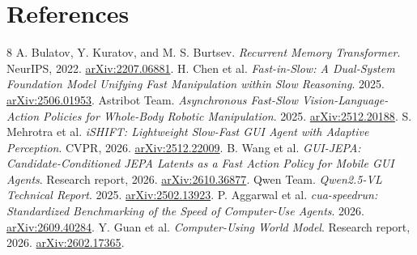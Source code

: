 \documentclass[11pt,letterpaper]{article}
\begin{document}
\section*{References}
\begingroup\small\raggedright
\renewcommand{\section}[2]{}%
\begin{thebibliography}{8}
\setlength{\itemsep}{3pt}
 A. Bulatov, Y. Kuratov, and M. S. Burtsev. \emph{Recurrent Memory Transformer}. NeurIPS, 2022. \href{https://arxiv.org/abs/2207.06881}{arXiv:2207.06881}.
 H. Chen et al. \emph{Fast-in-Slow: A Dual-System Foundation Model Unifying Fast Manipulation within Slow Reasoning}. 2025. \href{https://arxiv.org/abs/2506.01953}{arXiv:2506.01953}.
 Astribot Team. \emph{Asynchronous Fast-Slow Vision-Language-Action Policies for Whole-Body Robotic Manipulation}. 2025. \href{https://arxiv.org/abs/2512.20188}{arXiv:2512.20188}.
 S. Mehrotra et al. \emph{iSHIFT: Lightweight Slow-Fast GUI Agent with Adaptive Perception}. CVPR, 2026. \href{https://arxiv.org/abs/2512.22009}{arXiv:2512.22009}.
 B. Wang et al. \emph{GUI-JEPA: Candidate-Conditioned JEPA Latents as a Fast Action Policy for Mobile GUI Agents}. Research report, 2026. \href{https://arxiv.org/abs/2610.36877}{arXiv:2610.36877}.
 Qwen Team. \emph{Qwen2.5-VL Technical Report}. 2025. \href{https://arxiv.org/abs/2502.13923}{arXiv:2502.13923}.
 P. Aggarwal et al. \emph{cua-speedrun: Standardized Benchmarking of the Speed of Computer-Use Agents}. 2026. \href{https://arxiv.org/abs/2609.40284}{arXiv:2609.40284}.
 Y. Guan et al. \emph{Computer-Using World Model}. Research report, 2026. \href{https://arxiv.org/abs/2602.17365}{arXiv:2602.17365}.
\end{thebibliography}\endgroup
\end{document}
